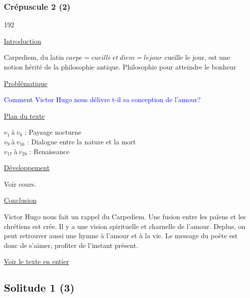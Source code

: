 \documentclass[12pt,a4paper]{article}
\begin{document}
				\subsubsection{Cr\'epuscule 2 (2)}

\begin{dingautolist}{192}

\item \underline{Introduction} \par
	Carpediem, du latin $carpe = cueille~et~diem = le jour$ cueille le jour, est une notion h\'erit\'e de la philosophie antique. Philosophie pour atteindre le bonheur 

\item \underline{Probl\'ematique }\par
		\textcolor{blue}{Comment Victor Hugo nous d\'elivre t-il sa conception de l'amour?}

\item \underline{Plan du texte} \par
		$v_{1}~$\`a$~v_{8}$ : Paysage nocturne\\
        $v_{9}~$\`a$~v_{16}$ : Dialogue entre la nature et la mort\\
        $v_{17}~$\`a$~v_{28}$ : Renaissance

\item \underline{D\'eveloppement} \par
	Voir cours.

\item \underline{Conclusion} \par
	Victor Hugo nous fait un rappel du Carpediem.
Une fusion entre les pa\"iens et les chr\'etiens est cr\'ee. Il y a une vision spirituelle et charnelle de l'amour. Deplus, on peut retrouver aussi une hymne \`a l'amour et \`a la vie.
Le message du po\`ete est donc de s'aimer, profiter de l'instant pr\'esent. 

\end{dingautolist}	
\href{.extra/Textes/Crepuscule.pdf}{Voir le texte en entier}
 \newpage
			\subsection{Solitude 1 (3)}
\end{document}
